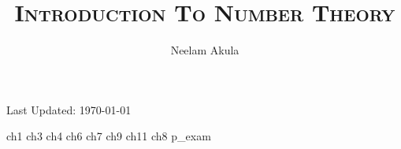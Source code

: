 \documentclass[fullpage]{article}
\title{\textsc{Introduction To Number Theory}}
\author{Neelam Akula}
\date{}
\newif\ifintro
\begin{document}
\pagestyle{empty}
\maketitle
\pagebreak
{\null\vfill\small Last Updated: \today}
\pagebreak

\setcounter{tocdepth}{2}
\tableofcontents
\newpage

\ifintro
\section*{Introduction}
\rule{\textwidth}{1pt}
\vspace{1.5in}
\paragraph{}
    This is a compilation of notes and homeworks for MATH 406,
    Introduction to Number Theory, to aid both current and future students
    in fully understanding the material. 
    The primary text used is \emph{Elementary Number Theory}, by Kenneth H. Rosen, 6th
    Edition. While the text is not required it is an excellent resource for additional
    problems. Chapters covered from the text are 1, 3, 4, 6, 7, 9, 11, and 8 in that order. With two
    midterms following chapters 1, 3, 4 and chapters 6, 7, 9. The final is cumulative with an
    emphasis on chapters 8 and 11.
    Lastly, the course is taught by Dr. Justin Wyss-Gallifent, on his personal site there are
    brief versions of each section's lecture notes. A list of his notes can be found
    \href{https://www.math.umd.edu/~immortal/MATH406/}{here}.
\addcontentsline{toc}{section}{Introduction}
\newpage
\fi

\pagestyle{plain}
{ch1}
\newpage
{ch3}
\newpage
{ch4}
\newpage
{ch6}
\newpage
{ch7}
\newpage
{ch9}
\newpage
{ch11}
\newpage
{ch8}
\newpage
{p_exam}
\end{document}
